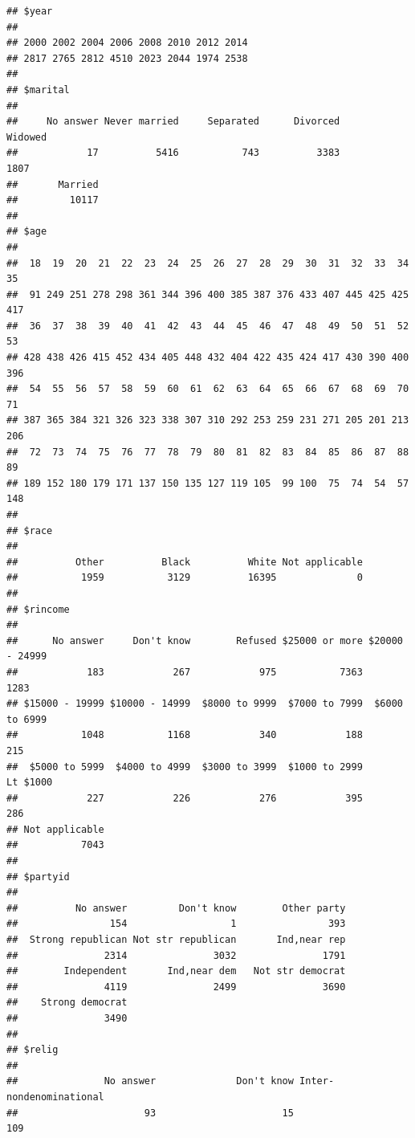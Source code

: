 \documentclass[]{book}
\newenvironment{Shaded}{\begin{snugshade}}{\end{snugshade}}
\newcommand{\KeywordTok}[1]{\textcolor[rgb]{0.13,0.29,0.53}{\textbf{#1}}}
\newcommand{\NormalTok}[1]{#1}
\newcommand{\OperatorTok}[1]{\textcolor[rgb]{0.81,0.36,0.00}{\textbf{#1}}}
\newcommand{\StringTok}[1]{\textcolor[rgb]{0.31,0.60,0.02}{#1}}
\theoremstyle{definition}
\theoremstyle{definition}
\theoremstyle{definition}
\theoremstyle{remark}
\begin{document}
\begin{Shaded}
\end{Shaded}

\begin{verbatim}
## $year
## 
## 2000 2002 2004 2006 2008 2010 2012 2014 
## 2817 2765 2812 4510 2023 2044 1974 2538 
## 
## $marital
## 
##     No answer Never married     Separated      Divorced       Widowed 
##            17          5416           743          3383          1807 
##       Married 
##         10117 
## 
## $age
## 
##  18  19  20  21  22  23  24  25  26  27  28  29  30  31  32  33  34  35 
##  91 249 251 278 298 361 344 396 400 385 387 376 433 407 445 425 425 417 
##  36  37  38  39  40  41  42  43  44  45  46  47  48  49  50  51  52  53 
## 428 438 426 415 452 434 405 448 432 404 422 435 424 417 430 390 400 396 
##  54  55  56  57  58  59  60  61  62  63  64  65  66  67  68  69  70  71 
## 387 365 384 321 326 323 338 307 310 292 253 259 231 271 205 201 213 206 
##  72  73  74  75  76  77  78  79  80  81  82  83  84  85  86  87  88  89 
## 189 152 180 179 171 137 150 135 127 119 105  99 100  75  74  54  57 148 
## 
## $race
## 
##          Other          Black          White Not applicable 
##           1959           3129          16395              0 
## 
## $rincome
## 
##      No answer     Don't know        Refused $25000 or more $20000 - 24999 
##            183            267            975           7363           1283 
## $15000 - 19999 $10000 - 14999  $8000 to 9999  $7000 to 7999  $6000 to 6999 
##           1048           1168            340            188            215 
##  $5000 to 5999  $4000 to 4999  $3000 to 3999  $1000 to 2999       Lt $1000 
##            227            226            276            395            286 
## Not applicable 
##           7043 
## 
## $partyid
## 
##          No answer         Don't know        Other party 
##                154                  1                393 
##  Strong republican Not str republican       Ind,near rep 
##               2314               3032               1791 
##        Independent       Ind,near dem   Not str democrat 
##               4119               2499               3690 
##    Strong democrat 
##               3490 
## 
## $relig
## 
##               No answer              Don't know Inter-nondenominational 
##                      93                      15                     109 

\end{verbatim}
\end{document}
